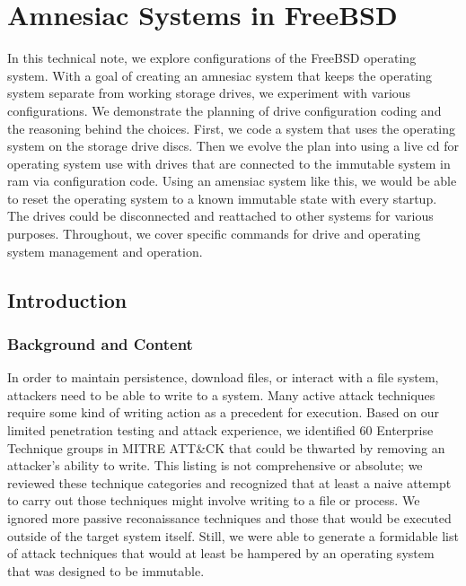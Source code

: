 
\chapter{Amnesiac Systems in FreeBSD}


		\noindent In this technical note, we explore  \gls{configuration}s of the FreeBSD  \gls{operating system}.  With a goal of creating an  \gls{amnesiac} system that keeps the  \gls{operating system} separate from working storage drives, we experiment with various  \gls{configuration}s.  We demonstrate the planning of drive  \gls{configuration}  \gls{coding} and the reasoning behind the choices.  First, we code a system that uses the  \gls{operating system} on the storage drive discs.  Then we evolve the plan into using a live cd for  \gls{operating system} use with drives that are connected to the \gls{immutable system} in \gls{ram} via \gls{configuration} code.  Using an amensiac system like this, we would be able to reset the  \gls{operating system} to a known immutable state with every startup.  The drives could be disconnected and reattached to other systems for various purposes.  Throughout, we cover specific commands for drive and  \gls{operating system} management and operation.

\section{Introduction}
\subsection{Background and Content}
In order to maintain persistence, download files, or interact with a file system, attackers need to be able to write to a system.  Many active \gls{attack} techniques require some kind of writing action as a precedent for execution.  Based on our limited penetration testing and \gls{attack} experience, we identified 60 Enterprise Technique groups in MITRE ATT\&CK  that could be thwarted by removing an attacker's ability to write.  This listing is not comprehensive or absolute; we reviewed these technique categories and recognized that at least a naive attempt to carry out those techniques might involve writing to a file or process.  We ignored more passive reconaissance techniques and those that would be executed outside of the target system itself.  Still, we were able to generate a formidable list of \gls{attack} techniques that would at least be hampered by an  \gls{operating system} that was designed to be immutable.

